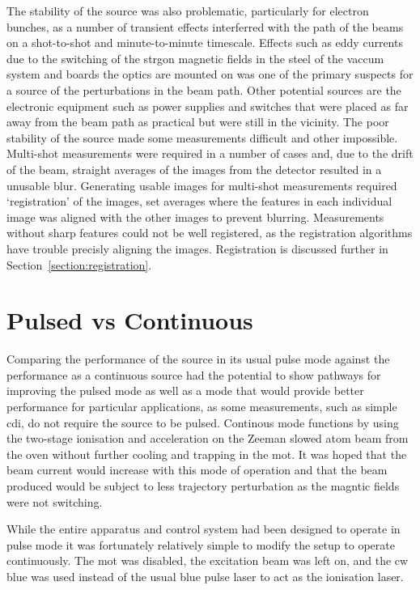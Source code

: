 The stability of the source was also problematic, particularly for electron bunches, as a number of transient effects interferred with the path of the beams on a shot-to-shot and minute-to-minute timescale.
Effects such as eddy currents due to the switching of the strgon magnetic fields in the steel of the vaccum system and boards the optics are mounted on was one of the primary suspects for a source of the perturbations in the beam path.
Other potential sources are the electronic equipment such as power supplies and switches that were placed as far away from the beam path as practical but were still in the vicinity.
The poor stability of the source made some measurements difficult and other impossible.
Multi-shot measurements were required in a number of cases and, due to the drift of the beam, straight averages of the images from the detector resulted in a unusable blur.
Generating usable images for multi-shot measurements required `registration' of the images, set averages where the features in each individual image was aligned with the other images to prevent blurring.
Measurements without sharp features could not be well registered, as the registration algorithms have trouble precisly aligning the images.
Registration is discussed further in Section~\ref{section:registration}.

\section{Pulsed vs Continuous}\label{section:pulse_vs_continuous}
Comparing the performance of the source in its usual pulse mode against the performance as a continuous source had the potential to show pathways for improving the pulsed mode as well as a mode that would provide better performance for particular applications, as some measurements, such as simple \gls{cdi}, do not require the source to be pulsed.
Continous mode functions by using the two-stage ionisation and acceleration on the Zeeman slowed atom beam from the oven without further cooling and trapping in the \gls{mot}.
It was hoped that the beam current would increase with this mode of operation and that the beam produced would be subject to less trajectory perturbation as the magntic fields were not switching.

While the entire apparatus and control system had been designed to operate in pulse mode it was fortunately relatively simple to modify the setup to operate continuously.
The \gls{mot} was disabled, the excitation beam was left on, and the \gls{cw} blue was used instead of the usual blue pulse laser to act as the ionisation laser.

